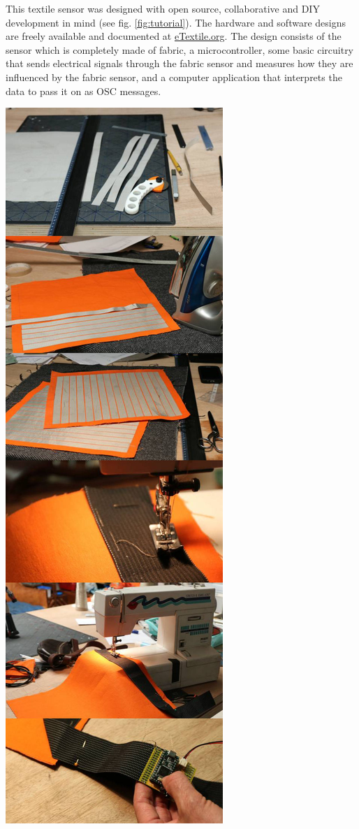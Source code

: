 \documentclass{sigchi-ext}
\begin{document}
This textile sensor was designed with open source, collaborative and DIY development in mind (see fig. \ref{fig:tutorial}). The hardware and software designs are freely available and documented at \url{eTextile.org}. The design consists of the sensor which is completely made of fabric, a microcontroller, some basic circuitry that sends electrical signals through the fabric sensor and measures how they are influenced by the fabric sensor, and a computer application that interprets the data to pass it on as OSC messages.

\begin{marginfigure}[-39ex]
  \begin{minipage}{\marginparwidth}
    \centering
    \includegraphics[width=0.9\marginparwidth]{figures/tutorial}

\end{minipage}
\end{marginfigure}
\end{document}
